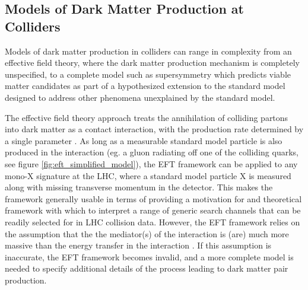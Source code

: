 \documentclass[12pt]{article}
\begin{document}
\subsection{Models of Dark Matter Production at Colliders}
Models of dark matter production in colliders can range in complexity from an effective field theory, where the dark matter production mechanism is completely unspecified, to a complete model such as supersymmetry \cite{susy_dm} which predicts viable matter candidates as part of a hypothesized extension to the standard model designed to address other phenomena unexplained by the standard model. 

The effective field theory approach treats the annihilation of colliding partons into dark matter as a contact interaction, with the production rate determined by a single parameter \cite{DM_colliders}. As long as a measurable standard model particle is also produced in the interaction (eg. a gluon radiating off one of the colliding quarks, see figure \ref{fig:eft_simplified_model}), the EFT framework can be applied to any mono-X signature at the LHC, where a standard model particle X is measured along with missing transverse momentum in the detector. This makes the framework generally usable in terms of providing a motivation for and theoretical framework with which to interpret a range of generic search channels that can be readily selected for in LHC collision data. However, the EFT framework relies on the assumption that the the mediator(s) of the interaction is (are) much more massive than the energy transfer in the interaction \cite{DM_colliders, beyond_eft}. If this assumption is inaccurate, the EFT framework becomes invalid, and a more complete model is needed to specify additional details of the process leading to dark matter pair production. 
\end{document}
